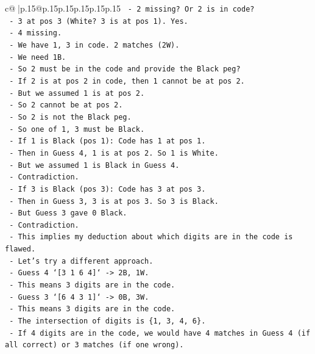 \documentclass{article}
\begin{document}
{\begin{supertabular}{c@{$\;$}|p{.15\linewidth}@{}p{.15\linewidth}p{.15\linewidth}p{.15\linewidth}p{.15\linewidth}p{.15\linewidth}}
{{{\texttt{        {-} 2 missing? Or 2 is in code?} \\
\texttt{        {-} 3 at pos 3 (White? 3 is at pos 1). Yes.} \\
\texttt{        {-} 4 missing.} \\
\texttt{        {-} We have 1, 3 in code. 2 matches (2W).} \\
\texttt{        {-} We need 1B.} \\
\texttt{        {-} So 2 must be in the code and provide the Black peg?} \\
\texttt{        {-} If 2 is at pos 2 in code, then 1 cannot be at pos 2.} \\
\texttt{        {-} But we assumed 1 is at pos 2.} \\
\texttt{        {-} So 2 cannot be at pos 2.} \\
\texttt{        {-} So 2 is not the Black peg.} \\
\texttt{        {-} So one of 1, 3 must be Black.} \\
\texttt{        {-} If 1 is Black (pos 1): Code has 1 at pos 1.} \\
\texttt{          {-} Then in Guess 4, 1 is at pos 2. So 1 is White.} \\
\texttt{          {-} But we assumed 1 is Black in Guess 4.} \\
\texttt{          {-} Contradiction.} \\
\texttt{        {-} If 3 is Black (pos 3): Code has 3 at pos 3.} \\
\texttt{          {-} Then in Guess 3, 3 is at pos 3. So 3 is Black.} \\
\texttt{          {-} But Guess 3 gave 0 Black.} \\
\texttt{          {-} Contradiction.} \\
\texttt{    {-} This implies my deduction about which digits are in the code is flawed.} \\
\texttt{    {-} Let's try a different approach.} \\
\texttt{    {-} Guess 4 `{[}3 1 6 4{]}` {-}> 2B, 1W.} \\
\texttt{    {-} This means 3 digits are in the code.} \\
\texttt{    {-} Guess 3 `{[}6 4 3 1{]}` {-}> 0B, 3W.} \\
\texttt{    {-} This means 3 digits are in the code.} \\
\texttt{    {-} The intersection of digits is \{1, 3, 4, 6\}.} \\
\texttt{    {-} If 4 digits are in the code, we would have 4 matches in Guess 4 (if all correct) or 3 matches (if one wrong).} \\
}}}
\end{supertabular}}
\end{document}
